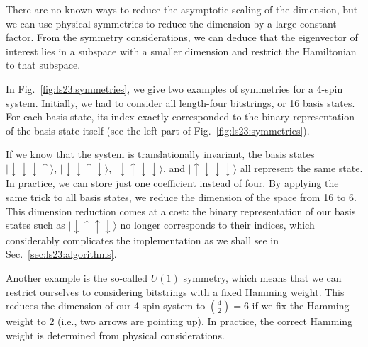 There are no known ways to reduce the asymptotic scaling of the dimension, but we can use physical symmetries to reduce the dimension by a large constant factor. From the symmetry considerations, we can deduce that the eigenvector of interest lies in a subspace with a smaller dimension and restrict the Hamiltonian to that subspace.

In Fig.~\ref{fig:ls23:symmetries}, we give two examples of symmetries for a 4-spin system. Initially, we had to consider all length-four bitstrings, or 16 basis states. For each basis state, its index exactly corresponded to the binary representation of the basis state itself (see the left part of Fig.~\ref{fig:ls23:symmetries}).

If we know that the system is translationally invariant, the basis states $|\downarrow\downarrow\downarrow\uparrow\rangle$, $|\downarrow\downarrow\uparrow\downarrow\rangle$, $|\downarrow\uparrow\downarrow\downarrow\rangle$, and $|\uparrow\downarrow\downarrow\downarrow\rangle$ all represent the same state. In practice, we can store just one coefficient instead of four. By applying the same trick to all basis states, we reduce the dimension of the space from 16 to 6. This dimension reduction comes at a cost: the binary representation of our basis states such as $|\downarrow\uparrow\uparrow\downarrow\rangle$ no longer corresponds to their indices, which considerably complicates the implementation as we shall see in Sec.~\ref{sec:ls23:algorithms}.

Another example is the so-called $U(1)$ symmetry, which means that we can restrict ourselves to considering bitstrings with a fixed Hamming weight. This reduces the dimension of our 4-spin system to $\binom{4}{2}=6$ if we fix the Hamming weight to 2 (i.e., two arrows are pointing up). In practice, the correct Hamming weight is determined from physical considerations.

